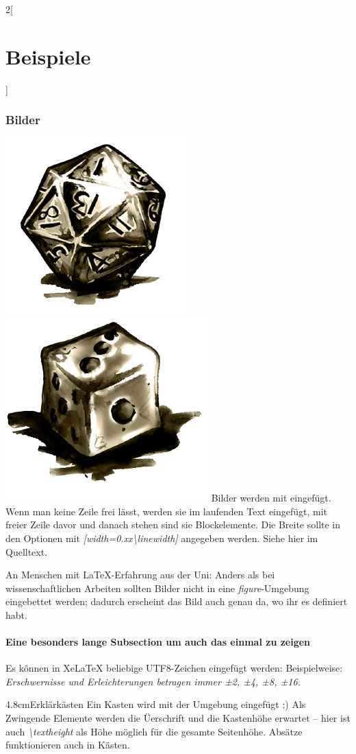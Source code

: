 \documentclass[linksbund]{rpg-ilaris}
\begin{document}
\begin{multicols}{2}[        %
		\chapter{Beispiele}  %
		]
\subsection{Bilder}
\includegraphics[width=0.5\linewidth]{würfel20.png}
\includegraphics[width=0.3\linewidth]{würfel6.png} 
%
	Bilder werden mit  eingefügt. Wenn man keine Zeile frei lässt, werden sie im laufenden Text eingefügt, mit freier Zeile davor und danach stehen sind sie Blockelemente.
	Die Breite sollte in den Optionen mit \emph{[width=0.xx\textbackslash{}linewidth]}  angegeben werden. 
	 Siehe hier im Quelltext. 

	An Menschen mit \LaTeX-Erfahrung aus der Uni:
     Anders als bei wissenschaftlichen Arbeiten sollten Bilder nicht in eine \emph{figure}-Umgebung eingebettet werden;
	 dadurch erscheint das Bild auch genau da, wo ihr es definiert habt.

\subsubsection{Eine besonders lange Subsection um auch das einmal zu zeigen}
Es können in XeLaTeX beliebige UTF8-Zeichen eingefügt werden: Beispielweise: 
	\emph{Erschwernisse und Erleichterungen betragen immer ±2, ±4, ±8, ±16.}

\begin{kasten}{4.8cm}{Erklärkästen}
	Ein Kasten wird mit der Umgebung  eingefügt ;) Als Zwingende Elemente werden die Üerschrift und die Kastenhöhe erwartet – hier ist auch \emph{\textbackslash{}textheight} als Höhe möglich für die gesamte Seitenhöhe.  
	Absätze funktionieren auch in Kästen.


\end{kasten}
\end{multicols}
\end{document}
